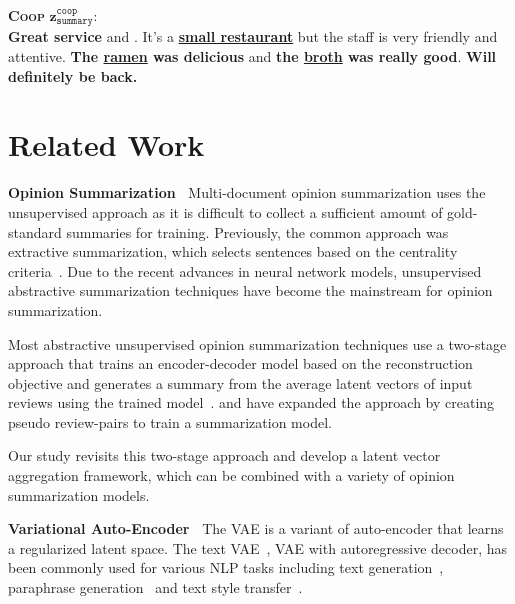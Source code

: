 \documentclass[11pt]{article}
\newcommand{\aggname}{\textsc{Coop}}
\newcommand{\name}{\mbox{\sc BiMeanVAE}}
\newcommand{\simpleavg}{\mbox{SimpleAvg}}
\newcommand{\yelp}{\mbox{\bf Yelp}}
\newcommand{\hl}[1]{#1}
\newcommand\two[1]{\textcolor{c2}{\textbf{#1}}}
\newcommand\three[1]{\textcolor{c3}{\textbf{#1}}}
\newcommand\four[1]{\textcolor{c4}{\textbf{#1}}}
\newcommand\five[1]{\textcolor{c5}{\textbf{#1}}}
\newcommand\six[1]{\textcolor{c6}{\textbf{#1}}}
\begin{document}
\begin{figure*}[th]
\begin{mdframed}
        \textbf{\aggname{}} $\boldsymbol{z}_{\texttt{summary}}^{\texttt{coop}}$:\\
        \two{Great service} and . It's a \three{\underline{small restaurant}} but the staff is very friendly and attentive. \four{The \underline{ramen} was delicious} and \five{the \underline{broth} was really good}. \six{Will definitely be back.}\\
        \end{mdframed}
    \vspace{-0.5em}
    \caption{Example of summaries generated by \name{} with \simpleavg{} and \aggname{} for reviews about a product on the \yelp{} dataset.
    The colors denote the corresponding opinions, and struck-through reviews in gray were not selected by \aggname{} for summary generation (Note that \simpleavg{} uses all the input reviews.) Terms that are more specific to the entity are underlined. }
    \label{fig:example-yelp}
\end{figure*}

\section{Related Work}
\noindent
{\bf Opinion Summarization~} Multi-document opinion summarization uses the unsupervised approach as it is difficult to collect a sufficient amount of gold-standard summaries for training.
Previously, the common approach was extractive summarization, which selects sentences based on the centrality criteria~\cite{erkan2004lexrank}.
Due to the recent advances in neural network models, unsupervised abstractive summarization techniques have become the mainstream for opinion summarization.

Most abstractive unsupervised opinion summarization techniques use a two-stage approach that trains an encoder-decoder model based on the reconstruction objective and generates a summary from the average latent \hl{vectors} of input reviews using the trained model~\cite{Chu:2019:MeanSum}. \citet{amplayo-lapata-2020-unsupervised} and \citet{amplayo2021unsupervised} \hl{have} expanded the approach by creating pseudo review-pairs to train a summarization model.

Our study revisits this two-stage approach and develop a latent \hl{vector} aggregation framework, which can be combined with \hl{a variety of} opinion summarization models.

\noindent
{\bf Variational Auto-Encoder~}
The VAE is a variant of auto-encoder that learns a regularized latent space. The text VAE~\cite{bowman-etal-2016-generating}, VAE with autoregressive decoder, has been commonly used for various NLP tasks including text generation~\cite{ye2020variational}, paraphrase generation~\cite{bao-etal-2019-generating} and text style transfer~\cite{hu2017toward,john-etal-2019-disentangled}.
\end{document}
